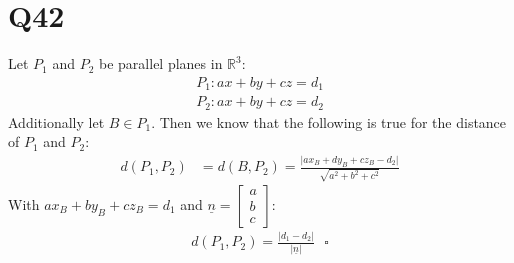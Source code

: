 \documentclass{article}
\renewcommand{\vec}{\underline}
\begin{document}
\section*{Q42}
Let $P_1$ and $P_2$ be parallel planes in $\mathbb{R}^3$:
\begin{align}
    P_1:ax+by+cz=d_1\\
    P_2:ax+by+cz=d_2
\end{align}
Additionally let $B\in P_1$. Then we know that the following is true for the distance of $P_1$ and $P_2$:
\begin{align}
    d(P_1,P_2)&=d(B,P_2)
    =\frac{\vert ax_B+dy_B+cz_B-d_2\vert}{\sqrt{a^2+b^2+c^2}}
\end{align}
With $ax_B+by_B+cz_B=d_1$ and $\vec n=\begin{bmatrix}
   a\\b\\c
\end{bmatrix}$:
\begin{align}
    d(P_1, P_2)=\frac{\vert d_1-d_2\vert}{\vert \vec n \vert}\:\:\:\square
\end{align}
\end{document}
